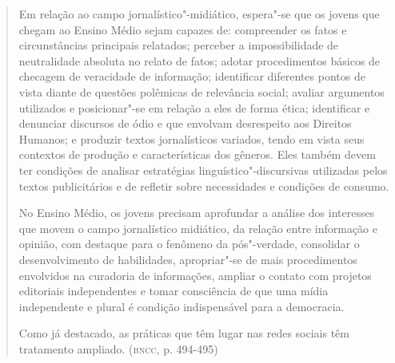 \documentclass[11pt]{extarticle}
\begin{document}
\begin{quote}
Em relação ao campo jornalístico"-midiático, espera"-se que os jovens
que chegam ao Ensino Médio sejam capazes de: compreender os fatos e
circunstâncias principais relatados; perceber a impossibilidade de
neutralidade absoluta no relato de fatos; adotar procedimentos básicos
de checagem de veracidade de informação; identificar diferentes pontos
de vista diante de questões polêmicas de relevância social; avaliar
argumentos utilizados e posicionar"-se em relação a eles de forma ética;
identificar e denunciar discursos de ódio e que envolvam desrespeito aos
Direitos Humanos; e produzir textos jornalísticos variados, tendo em
vista seus contextos de produção e características dos gêneros. Eles
também devem ter condições de analisar estratégias
linguístico"-discursivas utilizadas pelos textos publicitários e de
refletir sobre necessidades e condições de consumo.

No Ensino Médio, os jovens precisam aprofundar a análise dos interesses
que movem o campo jornalístico midiático, da relação entre informação e
opinião, com destaque para o fenômeno da pós"-verdade, consolidar o
desenvolvimento de habilidades, apropriar"-se de mais procedimentos
envolvidos na curadoria de informações, ampliar o contato com projetos
editoriais independentes e tomar consciência de que uma mídia
independente e plural é condição indispensável para a democracia.

Como já destacado, as práticas que têm lugar nas redes sociais têm
tratamento ampliado. (\textsc{bncc}, p. 494-495)
\end{quote}
\end{document}

